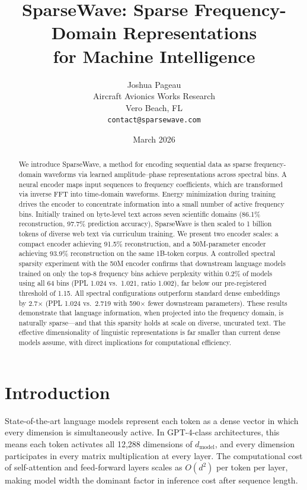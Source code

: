 \documentclass[10pt,twocolumn]{article}
\title{SparseWave: Sparse Frequency-Domain Representations\\for Machine Intelligence}
\author{
    Joshua Pageau\\
    Aircraft Avionics Works Research\\
    Vero Beach, FL\\
    \texttt{contact@sparsewave.com}
}
\date{March 2026}
\begin{document}
\maketitle

\begin{abstract}
We introduce SparseWave, a method for encoding sequential data as sparse frequency-domain waveforms via learned amplitude--phase representations across spectral bins. A neural encoder maps input sequences to frequency coefficients, which are transformed via inverse FFT into time-domain waveforms. Energy minimization during training drives the encoder to concentrate information into a small number of active frequency bins. Initially trained on byte-level text across seven scientific domains (86.1\% reconstruction, 97.7\% prediction accuracy), SparseWave is then scaled to 1 billion tokens of diverse web text via curriculum training. We present two encoder scales: a compact encoder achieving 91.5\% reconstruction, and a 50M-parameter encoder achieving 93.9\% reconstruction on the same 1B-token corpus. A controlled spectral sparsity experiment with the 50M encoder confirms that downstream language models trained on only the top-8 frequency bins achieve perplexity within 0.2\% of models using all 64 bins (PPL 1.024 vs.\ 1.021, ratio 1.002), far below our pre-registered threshold of 1.15. All spectral configurations outperform standard dense embeddings by 2.7$\times$ (PPL 1.024 vs.\ 2.719 with 590$\times$ fewer downstream parameters). These results demonstrate that language information, when projected into the frequency domain, is naturally sparse---and that this sparsity holds at scale on diverse, uncurated text. The effective dimensionality of linguistic representations is far smaller than current dense models assume, with direct implications for computational efficiency.
\end{abstract}

\section{Introduction}

State-of-the-art language models represent each token as a dense vector in which every dimension is simultaneously active. In GPT-4-class architectures, this means each token activates all 12,288 dimensions of $d_\text{model}$, and every dimension participates in every matrix multiplication at every layer. The computational cost of self-attention and feed-forward layers scales as $O(d^2)$ per token per layer, making model width the dominant factor in inference cost after sequence length.
\end{document}
